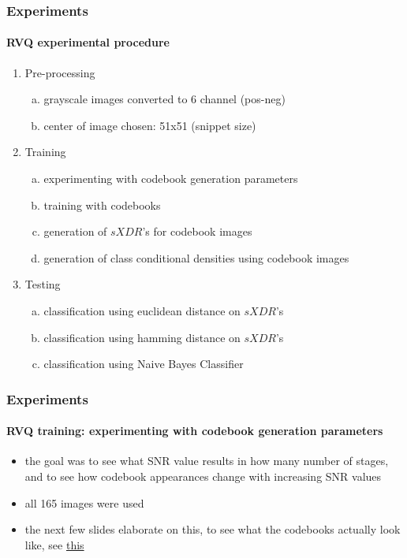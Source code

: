 \begin{frame}
\frametitle{Experiments}
\framesubtitle{RVQ experimental procedure}
\logoCSIPCPL\mypagenum	
	\begin{enumerate}
		\item Pre-processing
			\begin{enumerate}[(a)]
				\item grayscale images converted to 6 channel (pos-neg)
				\item center of image chosen: 51x51 (snippet size)
			\end{enumerate}
		\item Training
			\begin{enumerate}[(a)]
				\item experimenting with codebook generation parameters
				\item training with codebooks
				\item generation of $sXDR$'s for codebook images
				\item generation of class conditional densities using codebook images
			\end{enumerate}
		\item Testing
			\begin{enumerate}[(a)]
				\item classification using euclidean distance on $sXDR$'s
				\item classification using hamming distance on $sXDR$'s
				\item classification using Naive Bayes Classifier
			\end{enumerate}
	\end{enumerate}
\end{frame}



\begin{frame}
\frametitle{Experiments}
\framesubtitle{RVQ training: experimenting with codebook generation parameters}
\mypagenum	
		\begin{itemize}
			\item the goal was to see what SNR value results in how many number of stages, and to see how codebook appearances change with increasing SNR values
			\item all 165 images were used
			\item the next few slides elaborate on this, to see what the codebooks actually look like, see {\color{blue}  \href{http://users.ece.gatech.edu/~msalman/distribute/theory_3_PRML_RVQ_extensiveTraining.pdf}{this}}
		\end{itemize}
\end{frame}



